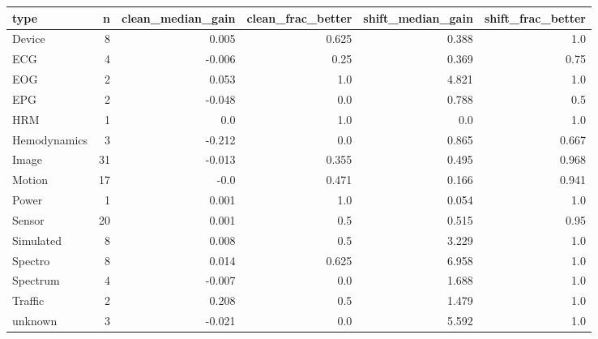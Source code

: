 \begin{tabular}{lrrrrr}
\toprule
type & n & clean_median_gain & clean_frac_better & shift_median_gain & shift_frac_better \\
\midrule
Device & 8 & 0.005 & 0.625 & 0.388 & 1.0 \\
ECG & 4 & -0.006 & 0.25 & 0.369 & 0.75 \\
EOG & 2 & 0.053 & 1.0 & 4.821 & 1.0 \\
EPG & 2 & -0.048 & 0.0 & 0.788 & 0.5 \\
HRM & 1 & 0.0 & 1.0 & 0.0 & 1.0 \\
Hemodynamics & 3 & -0.212 & 0.0 & 0.865 & 0.667 \\
Image & 31 & -0.013 & 0.355 & 0.495 & 0.968 \\
Motion & 17 & -0.0 & 0.471 & 0.166 & 0.941 \\
Power & 1 & 0.001 & 1.0 & 0.054 & 1.0 \\
Sensor & 20 & 0.001 & 0.5 & 0.515 & 0.95 \\
Simulated & 8 & 0.008 & 0.5 & 3.229 & 1.0 \\
Spectro & 8 & 0.014 & 0.625 & 6.958 & 1.0 \\
Spectrum & 4 & -0.007 & 0.0 & 1.688 & 1.0 \\
Traffic & 2 & 0.208 & 0.5 & 1.479 & 1.0 \\
unknown & 3 & -0.021 & 0.0 & 5.592 & 1.0 \\
\bottomrule
\end{tabular}
